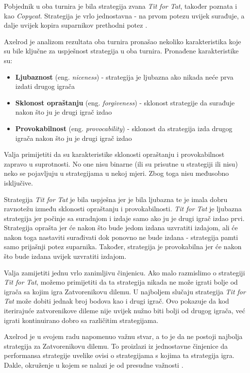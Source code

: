 \documentclass[zavrsnirad]{fer}
\begin{document}
		Pobjednik u oba turnira je bila strategija zvana \textit{Tit for Tat}, također poznata i kao \textit{Copycat}. Strategija je vrlo jednostavna - na prvom potezu uvijek surađuje, a dalje uvijek kopira suparnikov prethodni potez \cite{1980Axelrod1}.
	
		Axelrod je analizom rezultata oba turnira pronašao nekoliko karakteristika koje su bile ključne za uspješnost strategija u oba turnira. Pronađene karakteristike su:
		\begin{itemize}
			\item \textbf{Ljubaznost} (eng. \textit{niceness}) \cite{1980Axelrod1} - strategija je ljubazna ako nikada neće prva izdati drugog igrača
			\item \textbf{Sklonost opraštanju} (eng. \textit{forgiveness}) \cite{1980Axelrod1} - sklonost strategije da surađuje nakon što ju je drugi igrač izdao
			\item \textbf{Provokabilnost} (eng. \textit{provocability}) \cite{1980Axelrod2} - sklonost da strategija izda drugog igrača nakon što ju je drugi igrač izdao
		\end{itemize}
		
		Valja primijetiti da su karakteristike sklonosti opraštanju i provokabilnost zapravo u suprotnosti. No one nisu binarne (ili su prisutne u strategiji ili nisu) neko se pojavljuju u strategijama u nekoj mjeri. Zbog toga nisu međusobno isključive.
	
		Strategija \textit{Tit for Tat} je bila uspješna jer je bila ljubazna te je imala dobru ravnotežu između sklonosti opraštanju i provokabilnosti. \textit{Tit for Tat} je ljubazna strategija jer počinje sa suradnjom i izdaje samo ako ju je drugi igrač izdao prvi. Strategija oprašta jer će nakon što bude jedom izdana uzvratiti izdajom, ali će nakon toga nastaviti surađivati dok ponovno ne bude izdana - strategija pamti samo prijašnji potez suparnika. Također, strategija je provokabilna jer će nakon što bude izdana uvijek uzvratiti izdajom.
		
		Valja zamijetiti jednu vrlo zanimljivu činjenicu. Ako malo razmislimo o strategiji \textit{Tit for Tat}, možemo primijetiti da ta strategija nikada ne može igrati bolje od igrača sa kojim igra Zatvorenikovu dilemu. U najboljem slučaju strategija \textit{Tit for Tat} može dobiti jednak broj bodova kao i drugi igrač. Ovo pokazuje da kod iterirajuće zatvorenikove dileme nije uvijek nužno biti bolji od drugog igrača, već igrati kontinuirano dobro sa različitim strategijama. 
	
		Axelrod je u svojem radu napomenuo važnu stvar, a to je da ne postoji najbolja strategija za Zatvorenikovu dilemu. To proizlazi iz jednostavne činjenice da performansa strategije uvelike ovisi o strategijama s kojima ta strategija igra. Dakle, okruženje u kojem se nalazi je od presudne važnosti \cite{1980Axelrod1}.
	
\end{document}
